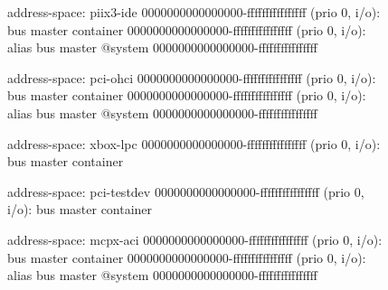 \begin{figure}
  \tiny
  \begin{minipage}{0.48\linewidth}
    \begin{ffcode}
    address-space: piix3-ide
      0000000000000000-ffffffffffffffff (prio 0, i/o): bus master container
        0000000000000000-ffffffffffffffff (prio 0, i/o): alias bus master @system 0000000000000000-ffffffffffffffff

    address-space: pci-ohci
      0000000000000000-ffffffffffffffff (prio 0, i/o): bus master container
        0000000000000000-ffffffffffffffff (prio 0, i/o): alias bus master @system 0000000000000000-ffffffffffffffff

    address-space: xbox-lpc
      0000000000000000-ffffffffffffffff (prio 0, i/o): bus master container

    address-space: pci-testdev
      0000000000000000-ffffffffffffffff (prio 0, i/o): bus master container

    address-space: mcpx-aci
      0000000000000000-ffffffffffffffff (prio 0, i/o): bus master container
        0000000000000000-ffffffffffffffff (prio 0, i/o): alias bus master @system 0000000000000000-ffffffffffffffff


\end{ffcode}
\end{minipage}
\end{figure}
